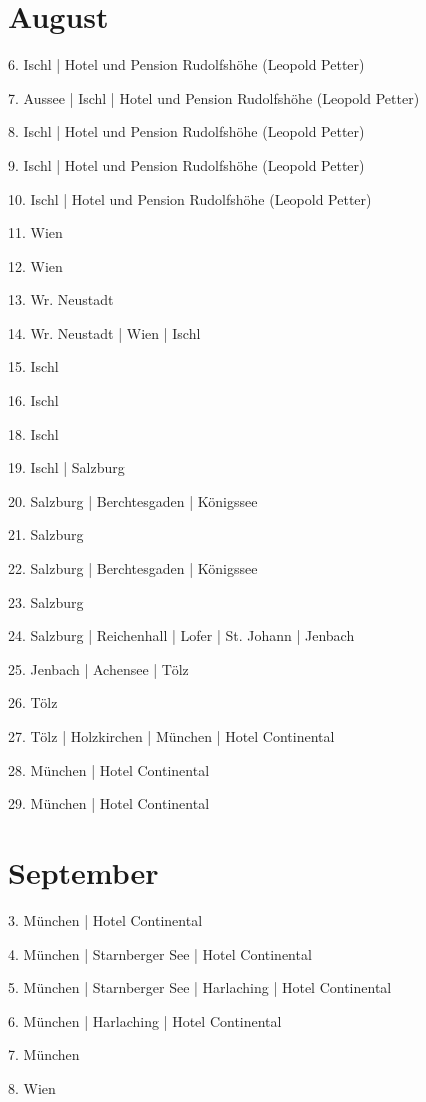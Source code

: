 \documentclass[twoside=false,titlepage=false,open=any, parskip=never, fontsize=10pt, headings=small, chapterprefix=false, appendixprefix=false, DIV=15]{scrbook}
\begin{document}
\begin{multicols}{3}
            \section*{August}
            6. Ischl | Hotel und Pension Rudolfshöhe (Leopold Petter)\par
            7. Aussee | Ischl | Hotel und Pension Rudolfshöhe (Leopold Petter)\par
            8. Ischl | Hotel und Pension Rudolfshöhe (Leopold Petter)\par
            9. Ischl | Hotel und Pension Rudolfshöhe (Leopold Petter)\par
            10. Ischl | Hotel und Pension Rudolfshöhe (Leopold Petter)\par
            11. Wien\par
            12. Wien\par
            13. Wr. Neustadt\par
            14. Wr. Neustadt | Wien | Ischl\par
            15. Ischl\par
            16. Ischl\par
            18. Ischl\par
            19. Ischl | Salzburg\par
            20. Salzburg | Berchtesgaden | Königssee\par
            21. Salzburg\par
            22. Salzburg | Berchtesgaden | Königssee\par
            23. Salzburg\par
            24. Salzburg | Reichenhall | Lofer | St. Johann | Jenbach\par
            25. Jenbach | Achensee | Tölz\par
            26. Tölz\par
            27. Tölz | Holzkirchen | München | Hotel Continental\par
            28. München | Hotel Continental\par
            29. München | Hotel Continental\par
            \section*{September}
            3. München | Hotel Continental\par
            4. München | Starnberger See | Hotel Continental\par
            5. München | Starnberger See | Harlaching | Hotel Continental\par
            6. München | Harlaching | Hotel Continental\par
            7. München\par
            8. Wien\par

\end{multicols}
\end{document}
